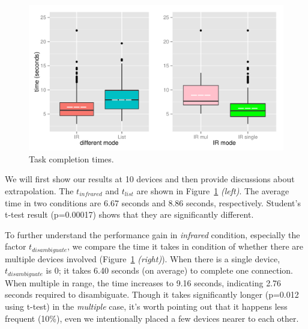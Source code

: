 \begin{figure}[t]
\centering
\includegraphics[width=1.0\columnwidth]{figures/R_time_by_Category.pdf}
\caption{Task completion times.} 
\label{fig:selection-times}
\end{figure}

We will first show our results at 10 devices and then provide discussions about extrapolation. The $t_{infrared}$ and $t_{list}$ are shown in Figure~\ref{fig:selection-times} {\em (left)}. The average time in two conditions are 6.67 seconds and 8.86 seconds, respectively. Student's t-test result (p=0.00017) shows that they are significantly different. 

To further understand the performance gain in {\em infrared} condition, especially the factor $t_{disambiguate}$, we compare the time it takes in condition of whether there are multiple devices involved (Figure~\ref{fig:selection-times} {\em (right)}). When there is a single device, $t_{disambiguate}$ is 0; it takes 6.40 seconds (on average) to complete one connection. When multiple in range, the time increases to 9.16 seconds, indicating 2.76 seconds required to disambiguate. Though it takes significantly longer (p=0.012 using t-test) in the {\em multiple} case, it's worth pointing out that it happens less frequent (10\%), even we intentionally placed a few devices nearer to each other. %




